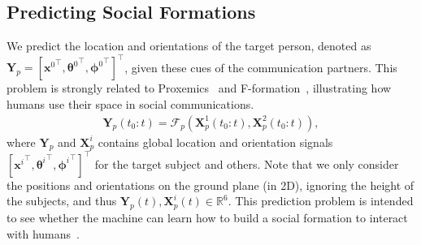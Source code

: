\subsection{Predicting Social Formations}
We predict the location and orientations of the target person, denoted as $\mathbf{Y}_p = [{\mathbf{x}^0}^{\top}, {\boldsymbol{\theta}^{0}}^{\top}, {\boldsymbol{\phi}^{0}}^{\top} ]^{\top}$, given these cues of the communication partners. This problem is strongly related to Proxemics~\cite{Hall66} and F-formation~\cite{kendon90}, illustrating how humans use their space in social communications.
\begin{gather}	
 \mathbf{Y}_p (t_0:t) = \mathcal{F}_p \left( \mathbf{X}_p^1(t_0:t), \mathbf{X}_p^2(t_0:t) \right),
 \label{eq:pred_formation}
\end{gather}
where $\mathbf{Y}_p$ and $\mathbf{X}_p^i$ contains global location and orientation signals $[{\mathbf{x}^i}^{\top}, {\boldsymbol{\theta}^{i}}^{\top}, {\boldsymbol{\phi}^{i}}^{\top} ]^{\top}$ for the target subject and others.
Note that we only consider the positions and orientations on the ground plane (in 2D), ignoring the height of the subjects, and thus $\mathbf{Y}_p(t), \mathbf{X}_p^i(t) \in \mathbb{R}^6$. This prediction problem is intended to see whether the machine can learn how to build a social formation to interact with humans~\cite{vazquez2017towards}.



